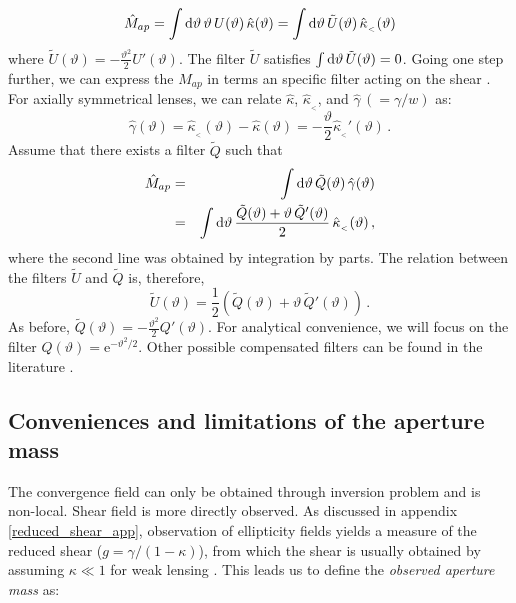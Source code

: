 \documentclass[twocolumn,aps,reprint, nofootinbib]{revtex4}
\newcommand{\e}{{\mathrm{e}}}
\newcommand{\dd}{{\rm d}}
\newcommand{\hkappa}{\hat{\kappa}_{_<}}
\newcommand{\hgamma}{\hat{\gamma}}
\newcommand{\tU}{\tilde{U}}
\newcommand{\tQ}{\tilde{Q}}
\newcommand{\Map}{\hat{M}_{ap}}
\begin{document}
\begin{equation}
\label{ipp_map}
\Map = \int \dd \vartheta \, \vartheta \, U(\vartheta) \, \hat{\kappa}(\vartheta)
= \int \dd \vartheta  \, \tU (\vartheta) \, \hkappa(\vartheta)
\end{equation}
where $\tU(\vartheta) = -\frac{\vartheta^2}{2} U'(\vartheta)$. The filter $\tU$ satisfies $\int \dd \vartheta \, \tU (\vartheta) =0$. 
Going one step further, we can express the $\hat{M}_{ap}$ in terms an specific filter acting on the shear \cite{schneider1996detection}. For axially symmetrical lenses, we can relate $\hat{\kappa}$, $\hkappa$, and $\hgamma \, (=\gamma/w)$ as:
\begin{equation}
\hgamma(\vartheta)   = \hkappa(\vartheta) - \hat{\kappa}(\vartheta) = - \frac{\vartheta}{2} \hkappa'(\vartheta) \, .
\end{equation}
Assume that there exists a filter $\tQ$ such that
\begin{eqnarray}
\label{gamma_Q}
\Map & = &   \int \dd \vartheta \,  \tQ(\vartheta) \, \hgamma(\vartheta) \nonumber\\ & = & \int \dd \vartheta \, \frac{\tQ(\vartheta) + \vartheta \,  \tQ'(\vartheta)}{2} \,  \hkappa(\vartheta) \, ,
\end{eqnarray}
where the second line was obtained by integration by parts. The relation between the filters $\tU$ and $\tQ$ is, therefore,
\begin{equation}
\tU(\vartheta) = \frac{1}{2} \left( \tQ(\vartheta) + \vartheta \, \tQ'(\vartheta) \right) \, .
\end{equation} 
As before, $\tQ(\vartheta) = -\frac{\vartheta^2}{2} Q'(\vartheta)$. For analytical convenience, we will focus on the filter  $Q(\vartheta) = \e^{- \vartheta^2/
2}$. Other possible compensated filters can be found in the literature \cite{schneider1996detection, bernardeau2000construction, crittenden2002discriminating}.

\subsection{Conveniences and limitations of the aperture mass}

The convergence field can only be obtained through inversion problem and is non-local. Shear field is more directly observed. As discussed in appendix \ref{reduced_shear_app}, observation of ellipticity fields yields a measure of the reduced shear ($g= \gamma/(1-\kappa)$), from which the shear is usually obtained by assuming $\kappa \ll 1$ for weak lensing \cite{kilbinger2015cosmology, munshi2008cosmology}. This leads us to define the \emph{observed aperture mass} as:
\end{document}
